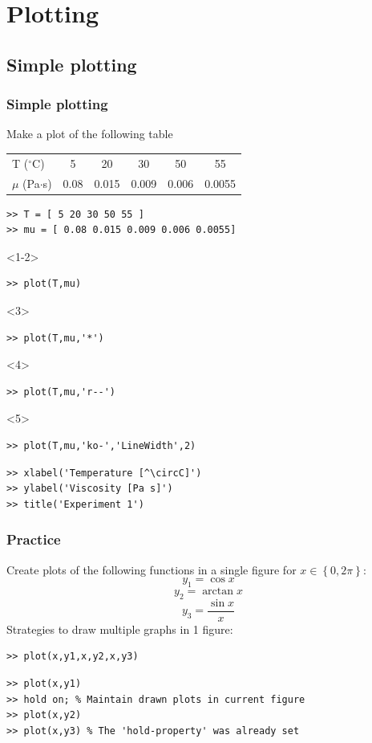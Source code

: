 \documentclass[11pt,table,final,fleqn,xcolor={usenames,dvipsnames},unknownkeysallowed,handout]{beamer}
\begin{document}
\section{Plotting}
\subsection*{Simple plotting}
\begin{frame}[fragile]
  \frametitle{Simple plotting}
  Make a plot of the following table
   \begin{longtable}{l!{\vrule}ccccc}
      T ($^\circ$C) & 5   &  20  & 30   & 50   & 55 \\
      $\mu$ (Pa$\cdot$s)  & 0.08& 0.015& 0.009& 0.006& 0.0055 \\
    \end{longtable} \pause
  \begin{lstlisting}
>> T = [ 5 20 30 50 55 ]
>> mu = [ 0.08 0.015 0.009 0.006 0.0055]
\end{lstlisting}
\begin{onlyenv}<1-2>
  \begin{lstlisting}
>> plot(T,mu)
  \end{lstlisting}
\end{onlyenv}
\begin{onlyenv}<3>
  \begin{lstlisting}
>> plot(T,mu,'*')
  \end{lstlisting}
\end{onlyenv}
\begin{onlyenv}<4>
  \begin{lstlisting}
>> plot(T,mu,'r--')
  \end{lstlisting}
\end{onlyenv}
\begin{onlyenv}<5>
  \begin{lstlisting}
>> plot(T,mu,'ko-','LineWidth',2)
  \end{lstlisting}
\end{onlyenv}
\begin{lstlisting}
>> xlabel('Temperature [^\circC]')
>> ylabel('Viscosity [Pa s]')
>> title('Experiment 1')
  \end{lstlisting}
\end{frame}

\begin{frame}[fragile]
 \frametitle{Practice}
 Create plots of the following functions in a single figure for $x \in \left\{0,2\pi\right\}$:
  \[
    y_1 = \cos x 
  \]
  \[
    y_2 = \arctan x 
  \]
  \[
    y_3 = \frac{\sin x }{x}
  \]
  \pause
  Strategies to draw multiple graphs in 1 figure:
 \begin{lstlisting}
>> plot(x,y1,x,y2,x,y3)
 \end{lstlisting}
  \begin{lstlisting}
>> plot(x,y1)
>> hold on; % Maintain drawn plots in current figure
>> plot(x,y2)
>> plot(x,y3) % The 'hold-property' was already set
  \end{lstlisting}
\end{frame}
\end{document}
